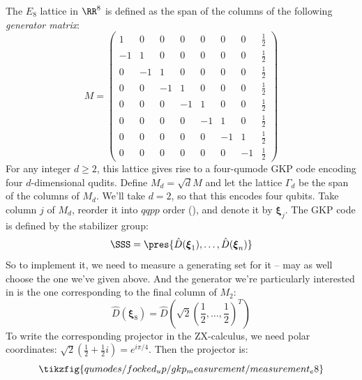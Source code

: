 \begin{example}
    The $E_8$ lattice in $\RR^{8}$ is defined as the span of the columns of the following \textit{generator matrix}:
    \begin{equation}\label{eq:E8_lattice_generator}
        M =
        \begin{pmatrix}
            1 & 0 & 0 & 0 & 0 & 0 & 0 & \frac{1}{2} \\
            -1 & 1 & 0 & 0 & 0 & 0 & 0 & \frac{1}{2} \\
            0 & -1 & 1 & 0 & 0 & 0 & 0 & \frac{1}{2} \\
            0 & 0 & -1 & 1 & 0 & 0 & 0 & \frac{1}{2} \\
            0 & 0 & 0 & -1 & 1 & 0 & 0 & \frac{1}{2} \\
            0 & 0 & 0 & 0 & -1 & 1 & 0 & \frac{1}{2} \\
            0 & 0 & 0 & 0 & 0 & -1 & 1 & \frac{1}{2} \\
            0 & 0 & 0 & 0 & 0 & 0 & -1 & \frac{1}{2}
        \end{pmatrix}
    \end{equation}
    For any integer $d \geq 2$, this lattice gives rise to a four-qumode GKP code encoding four $d$-dimensional qudits.
    Define $M_d = \sqrt{d}M$ and let the lattice $\Gamma_d$ be the span of the columns of $M_d$.
    We'll take $d = 2$, so that this encodes four qubits.
    Take column $j$ of $M_d$, reorder it into $qqpp$ order (), and denote it by $\boldsymbol{\xi}_j$.
    The GKP code is defined by the stabilizer group:
    \begin{equation}
        \SSS = \pres{\hat{D}(\boldsymbol{\xi}_1), \ldots, \hat{D}(\boldsymbol{\xi}_n)}
    \end{equation}
    So to implement it, we need to measure a generating set for it -- may as well choose the one we've given above.
    And the generator we're particularly interested in is the one corresponding to the final column of $M_2$:
    \begin{equation}
        \hat{D}(\boldsymbol{\xi}_8) = \hat{D}(\sqrt{2}(\frac{1}{2}, \ldots, \frac{1}{2})^T)
    \end{equation}
    To write the corresponding projector in the ZX-calculus, we need polar coordinates: $\sqrt{2}(\frac{1}{2} + \frac{1}{2}i) = e^{i\pi / 4}$.
    Then the projector is:
    \begin{equation}
        \tikzfig{qumodes/focked_up/gkp_measurement/measurement_e8}
    \end{equation}

\end{example}
